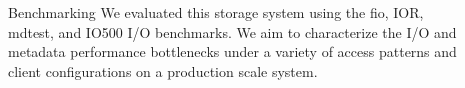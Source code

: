 \documentclass[final]{beamer}
\newlength{\sepwidth}
\newlength{\colwidth}
\newcommand{\separatorcolumn}{\begin{column}{\sepwidth}\end{column}}
\begin{document}
\begin{frame}[t, fragile]
\begin{columns}[t]
\begin{column}{\colwidth}
    \begin{block}{Benchmarking}
    We evaluated this storage system using the fio, IOR, mdtest, and IO500 I/O benchmarks. 
    We aim to characterize the I/O and metadata performance bottlenecks under a 
    variety of access patterns and client configurations on a production scale system.
    
  \end{block}

 
\end{column}

\separatorcolumn

\begin{column}{\colwidth}





\end{column}
\end{columns}
\end{frame}
\end{document}
